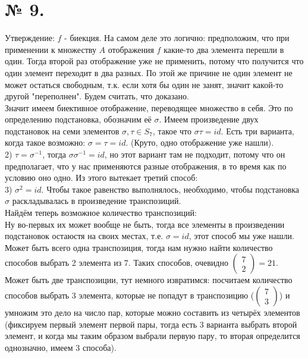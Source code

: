 \documentclass[a4paper,11pt]{report}
\begin{document}
\section{№ 9.}
Утверждение: $f$ - биекция. На самом деле это логично: предположим, что при применении к множеству $A$ отображения $f$
какие-то два элемента перешли в один. Тогда второй раз отображение уже не применить, потому что получится что один элемент 
переходит в два разных. По этой же причине не один элемент не может остаться свободным, т.к. если хотя бы один не занят, значит
какой-то другой "переполнен". Будем считать, что доказано.\\
Значит имеем биективное отображение, переводящее множество в себя. Это по определению подстановка, обозначим её $\sigma$.
Имеем произведение двух подстановок на семи элементов $\sigma, \tau \in S_7$, такое что $\sigma\tau = id$.
Есть три варианта, когда такое возможно: $\sigma = \tau = id$. (Круто, одно отображение уже нашли).\\
2) $\tau = \sigma^{-1}$, тогда $\sigma\sigma^{-1} = id$, но этот вариант там не подходит, потому что он предполагает, что у нас
применяются разные отображения, в то время как по условию оно одно. Из этого вытекает третий способ:\\
3) $\sigma^2 = id$. Чтобы такое равенство выполнялось, необходимо, чтобы подстановка $\sigma$ раскладывалась в произведение
транспозиций.\\
Найдём теперь возможное количество транспозиций:\\
Ну во-первых их может вообще не быть, тогда все элементы в произведении подстановок остаюстя на своих местах, т.е. 
$\sigma = id$, этот способ мы уже нашли.\\
Может быть всего одна транспозиция, тогда нам нужно найти количество способов выбрать 2 элемента из 7.
Таких способов, очевидно $
\begin{pmatrix}
7\\
2
\end{pmatrix}
 = 21$.\\
Может быть две транспозиции, тут немного извратимся: посчитаем количество способов выбрать 3 элемента, которые не попадут в транспозицию
($\begin{pmatrix}
   7\\
   3
  \end{pmatrix}
$) и умножим это дело на число пар, которые можно составить из четырёх элементов (фиксируем первый элемент первой пары,
тогда есть 3 варианта выбрать второй элемент, и когда мы таким образом выбрали первую пару, то вторая определится однозначно, имеем 3 способа).
\end{document}
